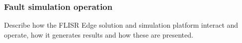 \subsubsection{Fault simulation operation}
\label{sec:operation}

Describe how the FLISR Edge solution and simulation platform interact and operate, how it generates results and how these are presented.


